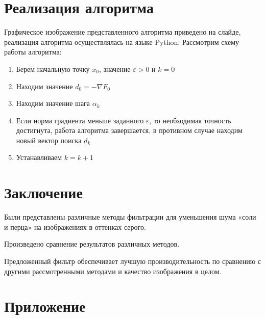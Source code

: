 \section{Реализация алгоритма}

Графическое изображение представленного алгоритма приведено на слайде,
реализация алгоритма осуществлялась на языке Python. Рассмотрим схему работы
алгоритма:

\begin{enumerate}
    \item Берем начальную точку $x_{0}$, значение $\varepsilon > 0$ и $k=0$
    \item Находим значение $d_{0} = -\nabla F_{0}$ 
    \item Находим значение шага $\alpha_{k}$
    \item Если норма градиента меньше заданного $\varepsilon$, то необходимая
    точность достигнута, работа алгоритма завершается, в противном случае
    находим новый вектор поиска $d_{k}$
    \item Устанавливаем $k = k + 1$
\end{enumerate}

\section{Заключение}

Были представлены различные методы фильтрации для уменьшения шума «соли и перца»
на изображениях в оттенках серого.

Произведено сравнение результатов различных методов.

Предложенный фильтр обеспечивает лучшую производительность по сравнению с
другими рассмотренными методами и качество изображения в целом.

\newpage
\nocite{*}
\printbibliography[heading=bibintoc]

\newpage
\section{Приложение}





\newpage





